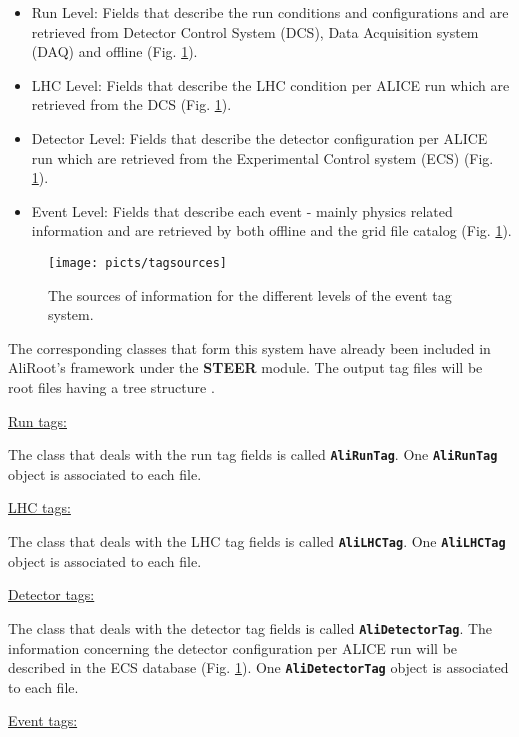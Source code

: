 \documentclass[12pt,a4paper,twoside]{article}
\newcommand{\class}[1]{\texttt{\textbf{#1}}\xspace}
\begin{document}
{\begin{itemize}
\item Run Level: Fields that describe the run conditions and
  configurations and are retrieved from Detector Control System (DCS),
  Data Acquisition system (DAQ) and offline (Fig. \ref{sources}). 

\item LHC Level: Fields that describe the LHC condition per ALICE run
  which are retrieved from the DCS (Fig. \ref{sources}). 

\item Detector Level: Fields that describe the detector configuration
  per ALICE run which are retrieved from the Experimental Control
  system (ECS) (Fig. \ref{sources}). 

\item Event Level: Fields that describe each event - mainly physics
  related information and are retrieved by both offline and the grid
  file catalog (Fig. \ref{sources}). 

\end{itemize}

\begin{figure}[ht!]
    \centering
    \texttt{[image: picts/tagsources]}
    \caption{The sources of information for the different levels of the event tag system.}
    \label{sources}
\end{figure}

The corresponding classes that form this system have already been
included in AliRoot's framework under the
\textbf{STEER} module. The output tag files will be root files having
a tree structure \cite{EventTagWeb}.

\underline{Run tags:}

The class that deals with the run tag fields is called
\class{AliRunTag}. One \class{AliRunTag} object is associated to
each file.

\underline{LHC tags:}

The class that deals with the LHC tag fields is called
\class{AliLHCTag}. One \class{AliLHCTag} object is associated to
each file.

\underline{Detector tags:}

The class that deals with the detector tag fields is called
\class{AliDetectorTag}. The information concerning the detector
configuration per ALICE run will be described in the ECS database
(Fig. \ref{sources}). One \class{AliDetectorTag} object is associated
to each file.

\underline{Event tags:}

}
\end{document}

